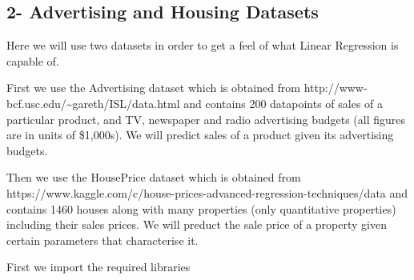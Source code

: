 \documentclass[11pt]{article}
\begin{document}
    \hypertarget{advertising-and-housing-datasets}{%
\subsection{2- Advertising and Housing
Datasets}\label{advertising-and-housing-datasets}}

Here we will use two datasets in order to get a feel of what Linear
Regression is capable of.

First we use the Advertising dataset which is obtained from
http://www-bcf.usc.edu/\textasciitilde{}gareth/ISL/data.html and
contains 200 datapoints of sales of a particular product, and TV,
newspaper and radio advertising budgets (all figures are in units of
\$1,000s). We will predict sales of a product given its advertising
budgets.

Then we use the HousePrice dataset which is obtained from
https://www.kaggle.com/c/house-prices-advanced-regression-techniques/data
and contains 1460 houses along with many properties (only quantitative
properties) including their sales prices. We will preduct the sale price
of a property given certain parameters that characterise it.

First we import the required libraries
\end{document}
